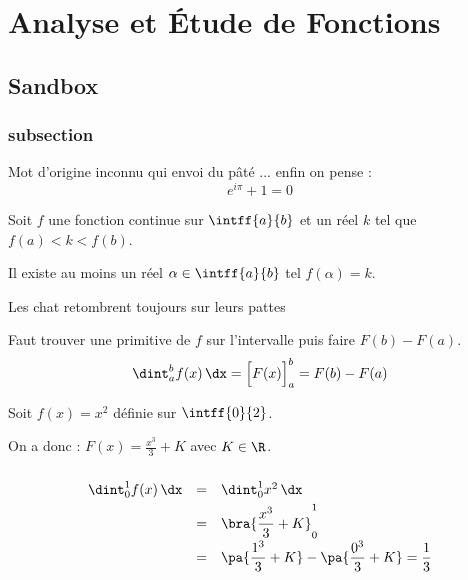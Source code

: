 \chapter{Analyse et Étude de Fonctions}

\section{Sandbox}
\subsection{subsection}

\begin{df}[Plop]
	Mot d'origine inconnu qui envoi du pâté ... enfin on pense : $$e^{i\pi}+1=0$$
\end{df}

\begin{thm}
	Soit $f$ une fonction continue sur $\intff{a}{b}$ et un réel $k$ tel que $f(a)\lt k \lt f(b)$.

	Il existe au moins un réel $\alpha\in\intff{a}{b}$ tel $f(\alpha)=k$.
\end{thm}


\begin{prop}[Interéssant]
	Les chat retombrent toujours sur leurs pattes
\end{prop}

\begin{demo}\lipsum[1]\end{demo}

\begin{meth}
	Faut trouver une primitive de $f$ sur l'intervalle puis faire $F(b)-F(a)$.
	$$\dint_a^b f(x)\, \dx = \Big\lbrack F(x)\Big\rbrack_a^b = F(b) - F(a)$$
\end{meth}


\begin{ex}
	Soit $f(x)=x^2$ définie sur $\intff{0}{2}$.

	On a donc : $F(x)=\frac{x^3}{3}+K$ avec $K\in\R$.

	$$
		\def\arraystretch{2}
		\begin{array}{rcl}
			\dint_0^1 f(x)\,\dx & = & \dint_0^1 x^2\,\dx \\ &=& \bra{\dfrac{x^3}{3}+K}_0^1 \\ &=& \pa{\dfrac{1^3}{3}+K}-\pa{\dfrac{0^3}{3}+K} =\dfrac13
		\end{array}
	$$
\end{ex}

